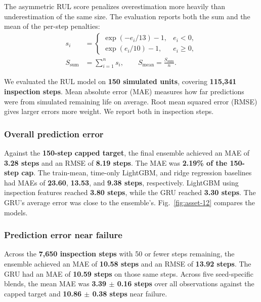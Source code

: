 \documentclass[conference]{IEEEtran}
\begin{document}
The asymmetric RUL score penalizes overestimation more heavily than underestimation of the same size. The evaluation reports both the sum and the mean of the per-step penalties:
\begin{equation}
\begin{aligned}
s_i &=
\begin{cases}
\exp(-e_i/13)-1, & e_i<0,\\
\exp(e_i/10)-1, & e_i\geq0,
\end{cases}\\
S_{\mathrm{sum}}&=\sum_{i=1}^{n}s_i,\qquad
S_{\mathrm{mean}}=\frac{S_{\mathrm{sum}}}{n}.
\end{aligned}
\end{equation}

We evaluated the RUL model on \textbf{150 simulated units}, covering \textbf{115,341 inspection steps}. Mean absolute error (MAE) measures how far predictions were from simulated remaining life on average. Root mean squared error (RMSE) gives larger errors more weight. We report both in inspection steps.

\subsubsection{Overall prediction error}

Against the \textbf{150-step capped target}, the final ensemble achieved an MAE of \textbf{3.28 steps} and an RMSE of \textbf{8.19 steps}. The MAE was \textbf{2.19\% of the 150-step cap}. The train-mean, time-only LightGBM, and ridge regression baselines had MAEs of \textbf{23.60}, \textbf{13.53}, and \textbf{9.38 steps}, respectively. LightGBM using inspection features reached \textbf{3.80 steps}, while the GRU reached \textbf{3.30 steps}. The GRU’s average error was close to the ensemble’s. Fig.~\ref{fig:asset-12} compares the models.

\subsubsection{Prediction error near failure}

Across the \textbf{7,650 inspection steps} with 50 or fewer steps remaining, the ensemble achieved an MAE of \textbf{10.58 steps} and an RMSE of \textbf{13.92 steps}. The GRU had an MAE of \textbf{10.59 steps} on those same steps. Across five seed-specific blends, the mean MAE was \textbf{3.39 \ensuremath{\pm} 0.16 steps} over all observations against the capped target and \textbf{10.86 \ensuremath{\pm} 0.38 steps} near failure.
\end{document}
